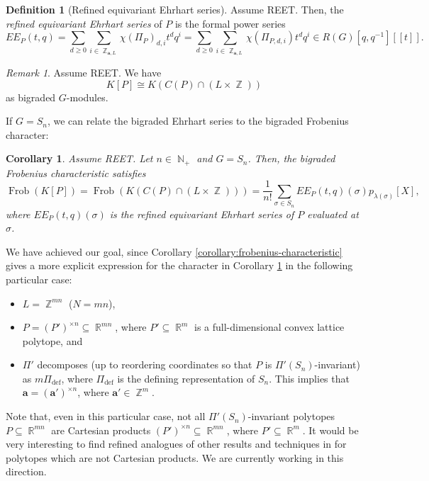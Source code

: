 \documentclass[a4paper,12pt]{amsart}
\theoremstyle{plain}
\newtheorem{corollary}[theorem]{Corollary}
\theoremstyle{definition}
\newtheorem{definition}[theorem]{Definition}
\theoremstyle{remark}
\newtheorem{remark}[theorem]{Remark}
\DeclareMathOperator{\NN}{\mathbb{N}}
\DeclareMathOperator{\ZZ}{\mathbb{Z}}
\DeclareMathOperator{\RR}{\mathbb{R}}
\DeclareMathOperator{\defining}{def}
\DeclareMathOperator{\Frob}{Frob}
\begin{document}
\begin{definition}[Refined equivariant Ehrhart series]
    Assume REET. Then, the \emph{refined equivariant Ehrhart series} of $P$ is the formal power series
    \[
    EE_P(t, q) = \sum_{d \geq 0} \sum_{i \in \ZZ_{\bm{a}, L}} \chi(\Pi_P)_{d, i} t^d q^i = \sum_{d \geq 0} \sum_{i \in \ZZ_{\bm{a}, L}} \chi(\Pi_{P, d, i}) t^dq^i \in R(G)[q, q^{-1}][\![ t ]\!].
    \]
\end{definition}
\begin{remark}
    Assume REET. We have
    \[
    K[P] \cong K(C(P) \cap (L \times \ZZ))
    \]
    as bigraded $G$-modules.
\end{remark}
If $G = S_n$, we can relate the bigraded Ehrhart series to the bigraded Frobenius character:
\begin{corollary}\label{corollary:relation-frob-ee}
    Assume REET. Let $n \in \NN_+$ and $G = S_n$. Then, the bigraded Frobenius characteristic satisfies
    \[
    \Frob(K[P])  = \Frob(K(C(P) \cap (L \times\ZZ)))  = \frac{1}{n!}\sum_{\sigma \in S_n} EE_P(t, q)(\sigma) p_{\lambda(\sigma)}[X],
    \]
    where $EE_P(t, q)(\sigma)$ is the refined equivariant Ehrhart series of $P$ evaluated at $\sigma$.
\end{corollary}

We have achieved our goal, since Corollary \ref{corollary:frobenius-characteristic} gives a more explicit expression for the character in Corollary \ref{corollary:relation-frob-ee} in the following particular case:

\begin{itemize}
    \item $L = \ZZ^{mn}$ ($N = mn$),
    \item $P = (P')^{\times n} \subseteq \RR^{mn}$, where $P' \subseteq \RR^m$ is a full-dimensional convex lattice polytope, and
    \item $\Pi'$ decomposes (up to reordering coordinates so that $P$ is $\Pi'(S_n)$-invariant) as $m\Pi_{\defining}$, where $\Pi_{\defining}$ is the defining representation of $S_n$. This implies that $\bm{a} = (\bm{a}')^{\times n}$, where $\bm{a}' \in \ZZ^m$.
\end{itemize}

Note that, even in this particular case, not all $\Pi'(S_n)$-invariant polytopes $P \subseteq \RR^{mn}$ are Cartesian products $(P')^{\times n} \subseteq \RR^{mn}$, where $P' \subseteq \RR^m$. It would be very interesting to find refined analogues of other results and techniques in \cite{elia-kim-supina-techniques} for polytopes which are not Cartesian products. We are currently working in this direction. \\
\end{document}
